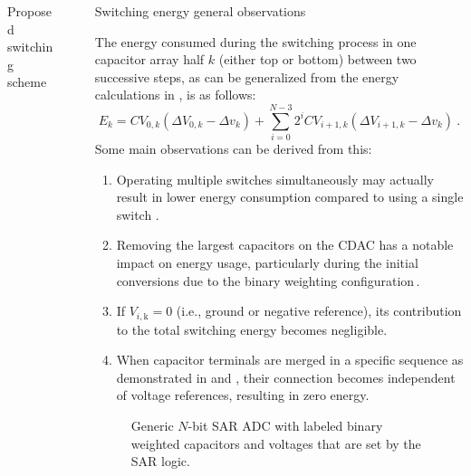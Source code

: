 \documentclass[final]{beamer}
\newlength{\sepwidth}
\newlength{\colwidth}
\newcommand{\separatorcolumn}{\begin{column}{\sepwidth}\end{column}}
\begin{document}
\begin{frame}[t]
\begin{columns}[t]
\begin{column}{\colwidth}
\begin{block}{Proposed switching scheme}
  \end{block}

  

\end{column}

\separatorcolumn

\begin{column}{\colwidth}

\begin{block}{Switching energy general observations}

    The energy consumed during the switching process in one capacitor array half $k$ (either top or bottom) between two successive steps, as can be generalized from the energy calculations in \cite{Ginsburg}, is as follows:
    \begin{equation} \label{eq:e}
        E_{k} = C V_{0,k} \left( \Delta V_{0,k} - \Delta v_{k} \right) + \sum_{i=0}^{N-3} 2^i C V_{i+1,k} \left( \Delta V_{i+1,k} - \Delta v_{k} \right) \ .
    \end{equation}
    Some main observations can be derived from this: 
    \begin{enumerate}
      \item Operating multiple switches simultaneously may actually result in lower energy consumption compared to using a single switch \cite{Xin21}.
      \item Removing the largest capacitors on the  CDAC has a notable impact on energy usage, particularly during the initial conversions due to the binary weighting configuration\,\cite{Yuan12, Sanyal13, Zhu13}. 
      \item If $V_{i,\text{k}} = 0$ (i.e., ground or negative reference), its contribution to the total switching energy becomes negligible. 
      \item When capacitor terminals are merged in a specific sequence as demonstrated in \cite{Xin21} and \cite{Wu17}, their connection becomes independent of voltage references, resulting in zero energy.
    \end{enumerate}

    \begin{figure}[t] \centering
    	
    	\caption{Generic $N$-bit SAR ADC with labeled binary weighted capacitors and voltages that are set by the SAR logic.}
        \label{fig:labels}
    \end{figure}



\end{block}
\end{column}
\end{columns}
\end{frame}
\end{document}
